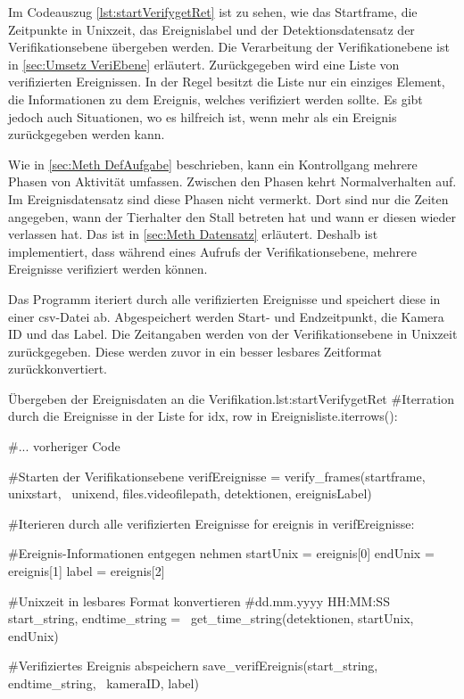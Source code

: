 Im Codeauszug \ref{lst:startVerifygetRet} ist zu sehen, wie das Startframe, die Zeitpunkte in Unixzeit, das Ereignislabel und der Detektionsdatensatz der Verifikationsebene übergeben werden. Die Verarbeitung der Verifikationebene ist in \autoref{sec:Umsetz VeriEbene} erläutert. Zurückgegeben wird eine Liste von verifizierten Ereignissen. In der Regel besitzt die Liste nur ein einziges Element, die Informationen zu dem Ereignis, welches verifiziert werden sollte. Es gibt jedoch auch Situationen, wo es hilfreich ist, wenn mehr als ein Ereignis zurückgegeben werden kann. \par

Wie in \autoref{sec:Meth DefAufgabe} beschrieben, kann ein Kontrollgang mehrere Phasen von Aktivität umfassen. Zwischen den Phasen kehrt Normalverhalten auf. Im Ereignisdatensatz sind diese Phasen nicht vermerkt. Dort sind nur die Zeiten angegeben, wann der Tierhalter den Stall betreten hat und wann er diesen wieder verlassen hat. Das ist in \autoref{sec:Meth Datensatz} erläutert. Deshalb ist implementiert, dass während eines Aufrufs der Verifikationsebene, mehrere Ereignisse verifiziert werden können. \par

Das Programm iteriert durch alle verifizierten Ereignisse und speichert diese in einer csv-Datei ab. Abgespeichert werden Start- und Endzeitpunkt, die Kamera ID und das Label. Die Zeitangaben werden von der Verifikationsebene in Unixzeit zurückgegeben. Diese werden zuvor in ein besser lesbares Zeitformat zurückkonvertiert. 

\begin{pythoncode}{Übergeben der Ereignisdaten an die Verifikation.}{lst:startVerifygetRet}
#Iterration durch die Ereignisse in der Liste
for idx, row in Ereignisliste.iterrows():  

    #... vorheriger Code

    #Starten der Verifikationsebene
    verifEreignisse = verify_frames(startframe, unixstart, \ 
        unixend, files.videofilepath, detektionen, ereignisLabel)

    #Iterieren durch alle verifizierten Ereignisse 
    for ereignis in verifEreignisse:  

        #Ereignis-Informationen entgegen nehmen        
        startUnix = ereignis[0]      
        endUnix = ereignis[1]
        label = ereignis[2]

        #Unixzeit in lesbares Format konvertieren
        #dd.mm.yyyy HH:MM:SS 
        start_string, endtime_string = \ 
            get_time_string(detektionen, startUnix, endUnix)

        #Verifiziertes Ereignis abspeichern 
        save_verifEreignis(start_string, endtime_string, \ 
            kameraID, label)
\end{pythoncode}

